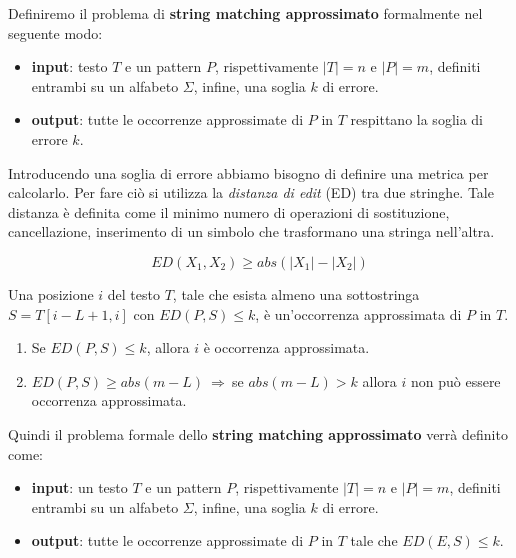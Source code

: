 Definiremo il problema di \textbf{string matching approssimato} formalmente nel seguente modo:
\begin{itemize}
    \item \textbf{input}: testo $T$ e un pattern $P$, rispettivamente $|T|=n$ e
          $|P|=m$, definiti entrambi su un alfabeto $\Sigma$, infine, una soglia $k$ di errore.
    \item \textbf{output}: tutte le occorrenze approssimate di $P$ in $T$
          respittano la soglia di errore $k$.
\end{itemize}
Introducendo una soglia di errore abbiamo bisogno di definire una metrica per
calcolarlo. Per fare ciò si utilizza la \textit{distanza di edit} (ED) tra due
stringhe. Tale distanza è definita come il minimo numero di operazioni di
sostituzione, cancellazione, inserimento di un simbolo che trasformano una
stringa nell'altra.
\begin{nota}
    \begin{equation}
        ED(X_1, X_2) \geq abs(|X_1| - |X_2|)
    \end{equation}
\end{nota}
\begin{definizione}
    Una posizione $i$ del testo $T$, tale che esista almeno una sottostringa
    $S = T[i - L + 1,i]$ con $ED(P, S) \leq k$, è un'occorrenza approssimata di
    $P$ in $T$.
\end{definizione}
\begin{nota}
    \begin{enumerate}
        \item Se $ED(P, S) \leq k$, allora $i$ è occorrenza approssimata.
        \item $ED(P, S) \geq abs(m - L) \ \Rightarrow \ $se $abs(m - L) > k$
              allora $i$ non può essere occorrenza approssimata.
    \end{enumerate}
\end{nota}
Quindi il problema formale dello \textbf{string matching approssimato} verrà definito come:
\begin{itemize}
    \item \textbf{input}: un testo $T$ e un pattern $P$, rispettivamente $|T|=n$
          e $|P|=m$, definiti entrambi su un alfabeto $\Sigma$, infine, una soglia $k$
          di errore.
    \item \textbf{output}: tutte le occorrenze approssimate di $P$ in $T$ tale
          che  $ED(E,S)\le k$.
\end{itemize}
